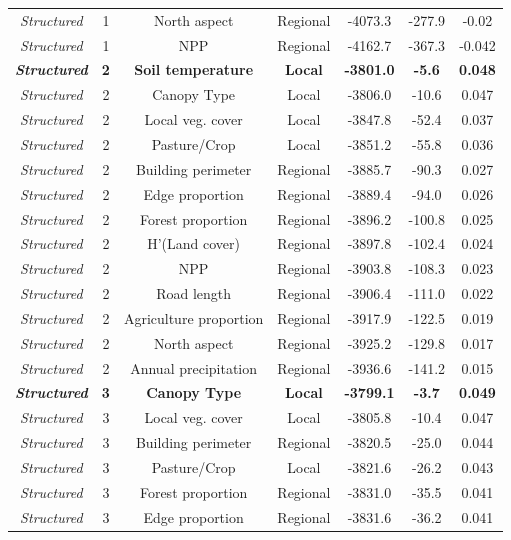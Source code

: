 \documentclass[preprint,final,times,12pt,3p]{elsarticle}
\begin{document}
\begin{longtable}{ c c c c c c c}
	\emph{Structured} & 1 & North aspect & Regional & -4073.3 & -277.9 & -0.02 \\
	\emph{Structured} & 1 & NPP & Regional & -4162.7 & -367.3 & -0.042 \\
	\textbf{\emph{Structured}} & \textbf{2} & \textbf{Soil temperature} & \textbf{Local} & \textbf{-3801.0} & \textbf{-5.6} & \textbf{0.048} \\
	\emph{Structured} & 2 & Canopy Type & Local & -3806.0 & -10.6 & 0.047 \\
	\emph{Structured} & 2 & Local veg. cover & Local & -3847.8 & -52.4 & 0.037 \\
	\emph{Structured} & 2 & Pasture/Crop & Local & -3851.2 & -55.8 & 0.036 \\
	\emph{Structured} & 2 & Building perimeter & Regional & -3885.7 & -90.3 & 0.027 \\
	\emph{Structured} & 2 & Edge proportion & Regional & -3889.4 & -94.0 & 0.026 \\
	\emph{Structured} & 2 & Forest proportion & Regional & -3896.2 & -100.8 & 0.025 \\
	\emph{Structured} & 2 & H'(Land cover) & Regional & -3897.8 & -102.4 & 0.024 \\
	\emph{Structured} & 2 & NPP & Regional & -3903.8 & -108.3 & 0.023 \\
	\emph{Structured} & 2 & Road length & Regional & -3906.4 & -111.0 & 0.022 \\
	\emph{Structured} & 2 & Agriculture proportion & Regional & -3917.9 & -122.5 & 0.019 \\
	\emph{Structured} & 2 & North aspect & Regional & -3925.2 & -129.8 & 0.017 \\
	\emph{Structured} & 2 & Annual precipitation & Regional & -3936.6 & -141.2 & 0.015 \\
	\textbf{\emph{Structured}} & \textbf{3} & \textbf{Canopy Type} & \textbf{Local} & \textbf{-3799.1} & \textbf{-3.7} & \textbf{0.049} \\
	\emph{Structured} & 3 & Local veg. cover & Local & -3805.8 & -10.4 & 0.047 \\
	\emph{Structured} & 3 & Building perimeter & Regional & -3820.5 & -25.0 & 0.044 \\
	\emph{Structured} & 3 & Pasture/Crop & Local & -3821.6 & -26.2 & 0.043 \\
	\emph{Structured} & 3 & Forest proportion & Regional & -3831.0 & -35.5 & 0.041 \\
	\emph{Structured} & 3 & Edge proportion & Regional & -3831.6 & -36.2 & 0.041 \\

\end{longtable}
\end{document}
